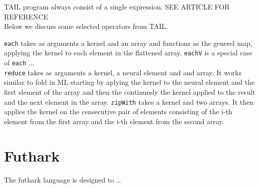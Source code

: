 \documentclass[11pt]{article}
\begin{document}
TAIL program always consist of a single expression. SEE ARTICLE FOR REFERENCE \\

Below we discuss some selected operators from TAIL.

{\tt each} takes as arguments a kernel and an array and functions as the generel map, applying the kernel to each element in the flattened array. 
{\tt eachV} is a special case of {\tt each} ...\\
{\tt reduce} takes as arguments a kernel, a neural element and and array. It works similar to fold in ML starting by aplying the kernel to the neural element and the first element of the array and then the continuesly the kernel applied to the result and the next element in the array. 
{\tt zipWith} takes a kernel and two arrays. It then applies the kernel on the censecutive pair of elements consisting of the i-th element from the first array and the i-th element from the second array. 




 



\section{Futhark}

The futhark language is designed to \dots
\end{document}
